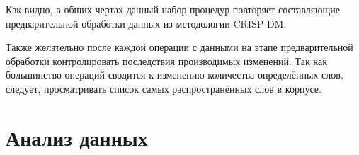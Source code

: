 Как видно, в общих чертах данный набор процедур повторяет составляющие предварительной обработки данных из методологии CRISP-DM.

Также желательно после каждой операции с данными на этапе предварительной обработки контролировать последствия производимых изменений. Так как большинство операций сводится к изменению количества определённых слов, следует, просматривать список самых распространённых слов в корпусе.


\section{Анализ данных}



\clearpage